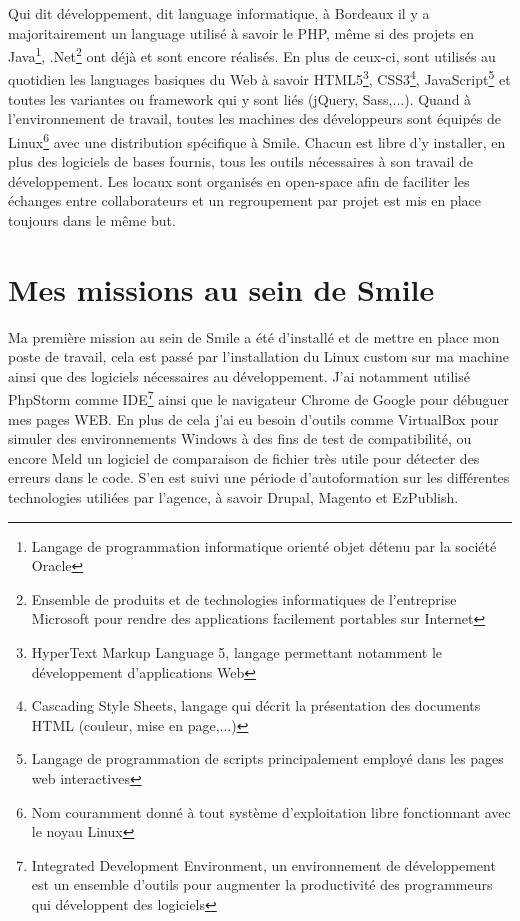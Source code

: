 \documentclass[a4paper,11pt,twoside]{report}
\begin{document}
  Qui dit développement, dit language informatique, à Bordeaux il y a majoritairement un language utilisé à savoir le PHP, même si des projets en Java\footnote{ Langage de programmation informatique orienté objet détenu par la société Oracle}, .Net\footnote{Ensemble de produits et de technologies informatiques de l'entreprise Microsoft pour rendre des applications facilement portables sur Internet} ont déjà et sont encore réalisés. En plus de ceux-ci, sont utilisés au quotidien les languages basiques du Web à savoir HTML5\footnote{HyperText Markup Language 5, langage permettant notamment le développement d'applications Web}, CSS3\footnote{Cascading Style Sheets, langage qui décrit la présentation des documents HTML (couleur, mise en page,...)}, JavaScript\footnote{Langage de programmation de scripts principalement employé dans les pages web interactives} et toutes les variantes ou framework qui y sont liés (jQuery, Sass,...). Quand à l'environnement de travail, toutes les machines des développeurs sont équipés de Linux\footnote{Nom couramment donné à tout système d'exploitation libre fonctionnant avec le noyau Linux} avec une distribution spécifique à Smile. Chacun est libre d'y installer, en plus des logiciels de bases fournis, tous les outils nécessaires à son travail de développement. Les locaux sont organisés en open-space afin de faciliter les échanges entre collaborateurs et un regroupement par projet est mis en place toujours dans le même but.
  
  \section{Mes missions au sein de Smile}
  Ma première mission au sein de Smile a été d'installé et de mettre en place mon poste de travail, cela est passé par l'installation du Linux custom sur ma machine ainsi que des logiciels nécessaires au développement. J'ai notamment utilisé PhpStorm comme IDE\footnote{Integrated Development Environment, un environnement de développement est un ensemble d'outils pour augmenter la productivité des programmeurs qui développent des logiciels} ainsi que le navigateur Chrome de Google pour débuguer mes pages WEB. En plus de cela j'ai eu besoin d'outils comme VirtualBox pour simuler des environnements Windows à des fins de test de compatibilité, ou encore Meld un logiciel de comparaison de fichier très utile pour détecter des erreurs dans le code. S'en est suivi une période d'autoformation sur les différentes technologies utiliées par l'agence, à savoir Drupal, Magento et EzPublish.\newline 
    
\end{document}
